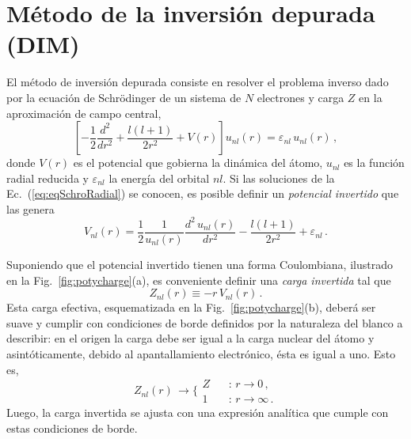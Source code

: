 \section{Método de la inversión depurada (DIM)}
\label{sec:dimatomos}

El método de inversión depurada consiste en resolver el problema inverso
dado por la ecuación de Schr\"odinger de un sistema de $N$ electrones y 
carga $Z$ en la aproximación de campo central, 
\begin{equation}
 \left[ -\frac{1}{2}\frac{d^2}{dr^2} + \frac{l(l+1)}{2r^2} +
 V(r) \right] u_{nl}(r) = \varepsilon_{nl} \, u_{nl}(r)\,,
\label{eq:eqSchroRadial}
\end{equation}
donde $V(r)$ es el potencial que gobierna la dinámica del átomo, 
$u_{nl}$ es la función radial reducida y $\varepsilon_{nl}$ la energía
del orbital $nl$. Si las soluciones de la Ec.~(\ref{eq:eqSchroRadial}) 
se conocen, es posible definir un \textit{potencial invertido} que las 
genera
\begin{equation}
V_{nl}(r) = 
\frac{1}{2}\frac{1}{u_{nl}(r)} \frac{d^2\,u_{nl}(r)}{dr^{2}} - 
\frac{l(l+1)}{2r^{2}}+\varepsilon_{nl} \,.
\label{eq:Vinv}
\end{equation}

Suponiendo que el potencial invertido tienen una forma Coulombiana, 
ilustrado en la Fig.~\ref{fig:potycharge}(a), es conveniente definir una 
\textit{carga invertida} tal que
\begin{equation}
Z_{nl}(r) \equiv -r \, V_{nl}(r) \,.
\label{eq:Zinv}
\end{equation}
Esta carga efectiva, esquematizada en la Fig.~\ref{fig:potycharge}(b), 
deberá ser suave y cumplir con condiciones de borde definidos por la 
naturaleza del blanco a describir: en el origen la carga debe 
ser igual a la carga nuclear del átomo y asintóticamente, debido al 
apantallamiento electrónico, ésta es igual a uno. Esto es,
\begin{equation}
Z_{nl}(r) \, \rightarrow 
\bigg\{ 
\begin{array}{ll}
Z  \ \  & \ \ \text{:\ \ }r  \rightarrow 0 \,, \\ 
1           & \ \ \text{:\ \ }r  \rightarrow \infty \,.
\end{array}
\label{eq:Zasympt}
\end{equation} 
Luego, la carga invertida se ajusta con una expresión analítica que 
cumple con estas condiciones de borde.

